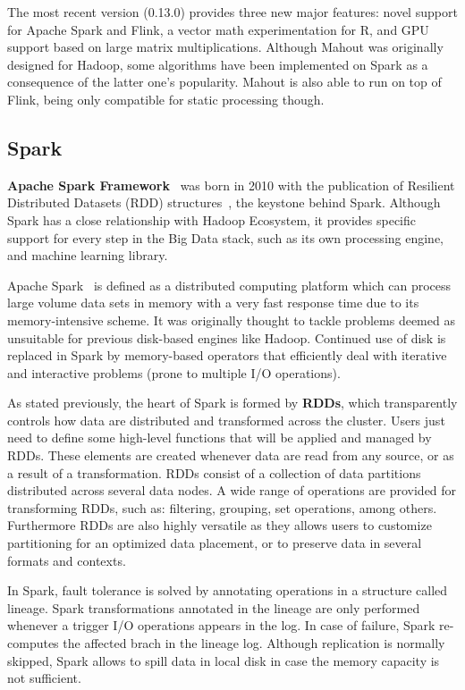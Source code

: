 \documentclass[3p,review]{elsarticle}
\begin{document}
The most recent version (0.13.0) provides three new major features: novel support for Apache Spark and Flink, a vector math experimentation for R, and GPU support based on large matrix multiplications. Although Mahout was originally designed for Hadoop, some algorithms have been implemented on Spark as a consequence of the latter one's popularity. Mahout is also able to run on top of Flink, being only compatible for static processing though.

\subsection{Spark}\label{subsec:spark}

\textbf{Apache Spark Framework}~\cite{spark} was born in 2010 with the publication of Resilient Distributed Datasets (RDD) structures~\cite{zaharia12}, the keystone behind Spark. Although Spark has a close relationship with Hadoop Ecosystem, it provides specific support for every step in the Big Data stack, such as its own processing engine, and machine learning library. 

Apache Spark~\cite{hamstra15} is defined as a distributed computing platform which can process large volume data sets in memory with a very fast response time due to its memory-intensive scheme. It was originally thought to tackle problems deemed as unsuitable for previous disk-based engines like Hadoop. Continued use of disk is replaced in Spark by memory-based operators that efficiently deal with iterative and interactive problems (prone to multiple I/O operations). 

As stated previously, the heart of Spark is formed by \textbf{RDDs}, which transparently controls how data are distributed and transformed across the cluster. Users just need to define some high-level functions that will be applied and managed by RDDs. These elements are created whenever data are read from any source, or as a result of a transformation. RDDs consist of a collection of data partitions distributed across several data nodes. A wide range of operations are provided for transforming RDDs, such as: filtering, grouping, set operations, among others. Furthermore RDDs are also highly versatile as they allows users to customize partitioning for an optimized data placement, or to preserve data in several formats and contexts.

In Spark, fault tolerance is solved by annotating operations in a structure called lineage. Spark transformations annotated in the lineage are only performed whenever a trigger I/O operations appears in the log. In case of failure, Spark re-computes the affected brach in the lineage log. Although replication is normally skipped, Spark allows to spill data in local disk in case the memory capacity is not sufficient. 
\end{document}
